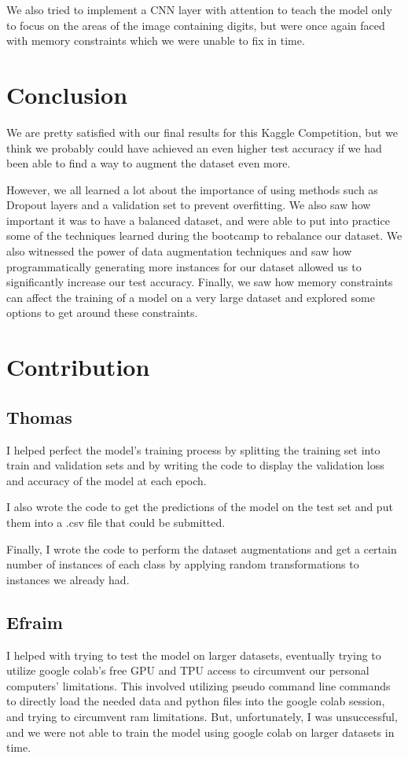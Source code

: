 \documentclass[12pt]{article}
\begin{document}
We also tried to implement a CNN layer with attention to teach the model only to focus on the areas of the image containing digits, but were once again faced with memory constraints which we were unable to fix in time.
\section{Conclusion}
We are pretty satisfied with our final results for this Kaggle Competition, but we think we probably could have achieved an even higher test accuracy if we had been able to find a way to augment the dataset even more. 

However, we all learned a lot about the importance of using methods such as Dropout layers and a validation set to prevent overfitting. We also saw how important it was to have a balanced dataset, and were able to put into practice some of the techniques learned during the bootcamp to rebalance our dataset. We also witnessed the power of data augmentation techniques and saw how programmatically generating more instances for our dataset allowed us to significantly increase our test accuracy. Finally, we saw how memory constraints can affect the training of a model on a very large dataset and explored some options to get around these constraints.
\section{Contribution}

\subsection{Thomas}
I helped perfect the model's training process by splitting the training set into train and validation sets and by writing the code to display the validation loss and accuracy of the model at each epoch.

I also wrote the code to get the predictions of the model on the test set and put them into a .csv file that could be submitted. 

Finally, I wrote the code to perform the dataset augmentations and get a certain number of instances of each class by applying random transformations to instances we already had.

\subsection{Efraim}
I helped with trying to test the model on larger datasets, eventually trying to utilize google colab's free GPU and TPU access to circumvent our personal computers' limitations. 
	This involved utilizing pseudo command line commands to directly load the needed data and python files into the google colab session, and trying to circumvent ram limitations. But, unfortunately, I was unsuccessful, and we were not able to train the model using google colab on larger datasets in time.    
\end{document}
